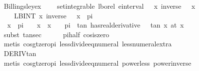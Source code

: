 \documentclass{article}
\theoremstyle{definition}
\begin{document}
\begin{figure}
\begin{isabellebody}
\isamarkupfalse%
\ Billingsley{\isacharunderscore}ex{\isacharunderscore}{}{}{\isacharunderscore}{}{\isacharcolon}\ \isanewline
\ \ \ {\isachardoublequoteopen}set{\isacharunderscore}integrable\ lborel\ {\isacharparenleft}einterval\ {\isacharparenleft}{\isacharminus}{\isasyminfinity}{\isacharparenright}\ {\isasyminfinity}{\isacharparenright}\ {\isacharparenleft}{\isasymlambda}x{\isachardot}\ inverse\ {\isacharparenleft}{}\ {\isacharplus}\ x{\isacharcircum}{}{\isacharparenright}{\isacharparenright}{\isachardoublequoteclose}\isanewline
\ \ \ \ {\isachardoublequoteopen}LBINT\ x{\isacharequal}{\isacharminus}{\isasyminfinity}{\isachardot}{\isachardot}{\isasyminfinity}{\isachardot}\ inverse\ {\isacharparenleft}{}\ {\isacharplus}\ x{\isacharcircum}{}{\isacharparenright}\ {\isacharequal}\ pi{\isachardoublequoteclose}\isanewline
{}\isamarkupfalse%
\ {\isacharminus}\isanewline
\ \ \isamarkupfalse%
\ {}{\isacharcolon}\ {\isachardoublequoteopen}{\isasymAnd}x{\isachardot}\ {\isacharminus}\ {\isacharparenleft}pi\ {\isacharslash}\ {}{\isacharparenright}\ {\isacharless}\ x\ {\isasymLongrightarrow}\ x\ {\isacharasterisk}\ {}\ {\isacharless}\ pi\ {\isasymLongrightarrow}\ {\isacharparenleft}tan\ has{\isacharunderscore}real{\isacharunderscore}derivative\ {}\ {\isacharplus}\ {\isacharparenleft}tan\ x{\isacharparenright}\ {\isacharparenleft}at\ x{\isacharparenright}{\isachardoublequoteclose}\isanewline
\ \ \ \ \isamarkupfalse%
\ {\isacharparenleft}subst\ tan{\isacharunderscore}sec{\isacharparenright}\isanewline
\ \ \ \ \isamarkupfalse%
\ pi{\isacharunderscore}half\ cos{\isacharunderscore}is{\isacharunderscore}zero\isanewline
\ \ \ \ \isamarkupfalse%
\ {\isacharparenleft}metis\ cos{\isacharunderscore}gt{\isacharunderscore}zero{\isacharunderscore}pi\ less{\isacharunderscore}divide{\isacharunderscore}eq{\isacharunderscore}numeral{}{\isacharparenleft}{}{\isacharparenright}\ less{\isacharunderscore}numeral{\isacharunderscore}extra{\isacharparenleft}{}{\isacharparenright}{\isacharparenright}\isanewline
\ \ \ \ \isamarkupfalse%
\ DERIV{\isacharunderscore}tan\isanewline
\ \ \ \ \isamarkupfalse%
\ {\isacharparenleft}metis\ cos{\isacharunderscore}gt{\isacharunderscore}zero{\isacharunderscore}pi\ less{\isacharunderscore}divide{\isacharunderscore}eq{\isacharunderscore}numeral{}{\isacharparenleft}{}{\isacharparenright}\ power{}{\isacharunderscore}less{\isacharunderscore}{}\ power{\isacharunderscore}inverse\ \isanewline

\end{isabellebody}
\end{figure}
\end{document}
